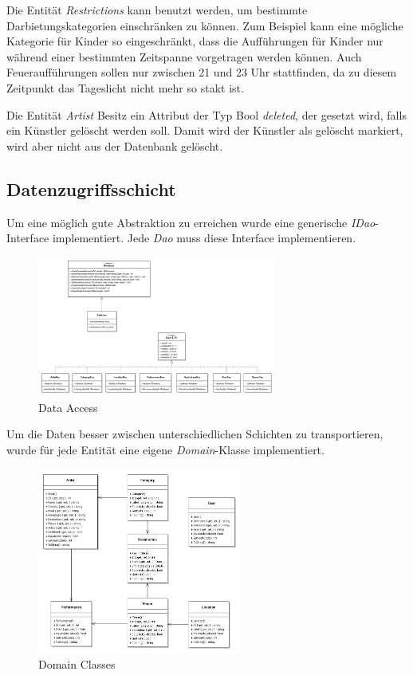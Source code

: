 \documentclass[12pt, a4paper]{article}
\begin{document}
Die Entität \textit{Restrictions} kann benutzt werden, um bestimmte Darbietungskategorien einschränken zu können. Zum Beispiel kann eine mögliche Kategorie für Kinder so eingeschränkt, dass die Aufführungen für Kinder nur während einer bestimmten Zeitspanne vorgetragen werden können. Auch Feueraufführungen sollen nur zwischen 21 und 23 Uhr stattfinden, da zu diesem Zeitpunkt das Tageslicht nicht mehr so stakt ist. 

Die Entität \textit{Artist} Besitz ein Attribut der Typ Bool \textit{deleted}, der gesetzt wird, falls ein Künstler gelöscht werden soll. Damit wird der Künstler als gelöscht markiert, wird aber nicht aus der Datenbank gelöscht.

\subsection{Datenzugriffsschicht}

Um eine möglich gute Abstraktion zu erreichen wurde eine generische \textit{IDao}-Interface implementiert. Jede \textit{Dao} muss diese Interface implementieren.

\begin{figure}[h] 	
	\centering
		\includegraphics[width=0.7\textwidth]{Dao.png}
	\caption{Data Access}
\end{figure}

Um die Daten besser zwischen unterschiedlichen Schichten zu transportieren, wurde für jede Entität eine eigene \textit{Domain}-Klasse implementiert.

\begin{figure}[h] 	
	\centering
		\includegraphics[width=0.6\textwidth]{DomainClasses.png}
	\caption{Domain Classes}
\end{figure}
\end{document}
